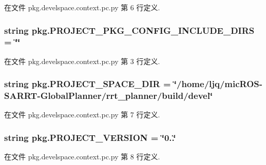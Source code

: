 在文件 pkg.\-develspace.\-context.\-pc.\-py 第 6 行定义.

\hypertarget{namespacepkg_a2760bf8266ff58da440f65ee91b203ab}{
\subsubsection[{P\-R\-O\-J\-E\-C\-T\-\_\-\-P\-K\-G\-\_\-\-C\-O\-N\-F\-I\-G\-\_\-\-I\-N\-C\-L\-U\-D\-E\-\_\-\-D\-I\-R\-S}]{\setlength{\rightskip}{0pt plus 5cm}string pkg.\-P\-R\-O\-J\-E\-C\-T\-\_\-\-P\-K\-G\-\_\-\-C\-O\-N\-F\-I\-G\-\_\-\-I\-N\-C\-L\-U\-D\-E\-\_\-\-D\-I\-R\-S = \char`\"{}\char`\"{}}}\label{namespacepkg_a2760bf8266ff58da440f65ee91b203ab}


在文件 pkg.\-develspace.\-context.\-pc.\-py 第 3 行定义.

\hypertarget{namespacepkg_a3f0f1b4bc03c596525e025539ca4332f}{
\subsubsection[{P\-R\-O\-J\-E\-C\-T\-\_\-\-S\-P\-A\-C\-E\-\_\-\-D\-I\-R}]{\setlength{\rightskip}{0pt plus 5cm}string pkg.\-P\-R\-O\-J\-E\-C\-T\-\_\-\-S\-P\-A\-C\-E\-\_\-\-D\-I\-R = \char`\"{}/home/ljq/mic\-R\-O\-S-\/S\-A\-R\-R\-T-\/Global\-Planner/rrt\-\_\-planner/build/devel\char`\"{}}}\label{namespacepkg_a3f0f1b4bc03c596525e025539ca4332f}


在文件 pkg.\-develspace.\-context.\-pc.\-py 第 7 行定义.

\hypertarget{namespacepkg_ab1037914b9286bb61855131c06149648}{
\subsubsection[{P\-R\-O\-J\-E\-C\-T\-\_\-\-V\-E\-R\-S\-I\-O\-N}]{\setlength{\rightskip}{0pt plus 5cm}string pkg.\-P\-R\-O\-J\-E\-C\-T\-\_\-\-V\-E\-R\-S\-I\-O\-N = \char`\"{}0..\char`\"{}}}\label{namespacepkg_ab1037914b9286bb61855131c06149648}


在文件 pkg.\-develspace.\-context.\-pc.\-py 第 8 行定义.

